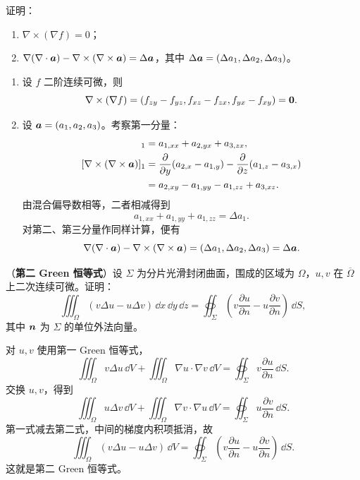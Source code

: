\begin{xexercise}[1]
证明：
\begin{enumerate}[label=(\arabic*)]
  \item $\nabla\times(\nabla f)=0$；
  \item $\nabla(\nabla\cdot\bm{a})-\nabla\times(\nabla\times\bm{a})=\Delta\bm{a}$，其中 $\Delta\bm{a}=(\Delta a_1,\Delta a_2,\Delta a_3)$。
\end{enumerate}
\end{xexercise}
\begin{xsolution}
\begin{enumerate}[label=(\arabic*)]
  \item 设 $f$ 二阶连续可微，则
  \[
    \nabla\times(\nabla f)
    =\left(
      f_{zy}-f_{yz},
      f_{xz}-f_{zx},
      f_{yx}-f_{xy}
    \right)=\bm{0}.
  \]

  \item 设 $\bm{a}=(a_1,a_2,a_3)$。考察第一分量：
  \begin{align*}
    [\nabla(\nabla\cdot\vect{a})]_1
    &=a_{1,xx}+a_{2,yx}+a_{3,zx},\\
    [\nabla\times(\nabla\times\vect{a})]_1
    &=\frac{\partial}{\partial y}(a_{2,x}-a_{1,y})
      -\frac{\partial}{\partial z}(a_{1,z}-a_{3,x})\\
    &=a_{2,xy}-a_{1,yy}-a_{1,zz}+a_{3,xz}.
  \end{align*}
  由混合偏导数相等，二者相减得到
  \[
    a_{1,xx}+a_{1,yy}+a_{1,zz}=\Delta a_1.
  \]
  对第二、第三分量作同样计算，便有
  \[
    \nabla(\nabla\cdot\bm{a})-\nabla\times(\nabla\times\bm{a})
    =(\Delta a_1,\Delta a_2,\Delta a_3)
    =\Delta\bm{a}.
  \]
\end{enumerate}
\end{xsolution}


\begin{xexercise}[2]
（\textbf{第二 Green 恒等式}）设 $\Sigma$ 为分片光滑封闭曲面，围成的区域为 $\Omega$，$u,v$ 在 $\overline\Omega$ 上二次连续可微。证明：
\[
  \iiint_\Omega(v\Delta u-u\Delta v)\,\dd x\,\dd y\,\dd z
  =\oiint_\Sigma\left(v\frac{\partial u}{\partial n}-u\frac{\partial v}{\partial n}\right)\,\dd S,
\]
其中 $\bm{n}$ 为 $\Sigma$ 的单位外法向量。
\end{xexercise}
\begin{xsolution}
对 $u,v$ 使用第一 Green 恒等式，
\[
  \iiint_\Omega v\Delta u\,\dd V
  +\iiint_\Omega\nabla u\cdot\nabla v\,\dd V
  =\oiint_\Sigma v\frac{\partial u}{\partial n}\,\dd S.
\]
交换 $u,v$，得到
\[
  \iiint_\Omega u\Delta v\,\dd V
  +\iiint_\Omega\nabla v\cdot\nabla u\,\dd V
  =\oiint_\Sigma u\frac{\partial v}{\partial n}\,\dd S.
\]
第一式减去第二式，中间的梯度内积项抵消，故
\[
  \boxed{
  \iiint_\Omega(v\Delta u-u\Delta v)\,\dd V
  =\oiint_\Sigma\left(
  v\frac{\partial u}{\partial n}
  -u\frac{\partial v}{\partial n}
  \right)\,\dd S
  }.
\]
这就是第二 Green 恒等式。
\end{xsolution}


